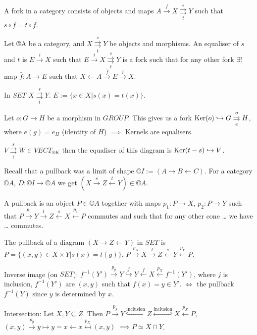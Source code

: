 \documentclass[12pt]{article}					%
\begin{document}
\begin{priklady}[Equalisers]
	A fork in a category consists of objects and maps $A \overset{f}\rightarrow X \overset{s}{\underset{t}\rightrightarrows} Y$ such that $s ∘ f = t ∘ f$.
	\begin{definicein}
		Let ®A be a category, and $X \overset{s}{\underset{t}\rightrightarrows} Y$ be objects and morphisms. An equaliser of $s$ and $t$ is $E \overset{i}\rightarrow X$ such that $E \overset{i}\rightarrow X \overset{s}{\underset{t}\rightrightarrows} Y$ is a fork such that for any other fork $\exists!$ map $\hat{f}: A \rightarrow E$ such that $X \leftarrow A \overset{\hat{f}}\rightarrow E \overset{i}\rightarrow X$.
	\end{definicein}
\end{priklady}

\begin{priklady}
	In $SET$ $X \overset{s}{\underset{t}\rightrightarrows}Y$. $E := \{x \in X | s(x) = t(x)\}$.

	Let $o: G \rightarrow H$ be a morphism in $GROUP$. This gives us a fork $\operatorname{Ker}(o) \hookrightarrow G \overset{o}{\underset{e}\rightrightarrows} H$, where $e(g) = e_H$ (identity of $H$) $\implies$ Kernels are equalisers.

	$V \overset{s}{\underset{t}\rightrightarrows} W \in VECT_{®K}$ then the equaliser of this diagram is $\operatorname{Ker}(t - s) \hookrightarrow V$.
\end{priklady}

\begin{poznamka}[Pullbacks]
	Recall that a pullback was a limit of shape $©I := (A \rightarrow B \leftarrow C)$. For a category $©A$, $D: ©I \rightarrow ©A$ we get $(X \overset{s}\rightarrow Z \overset{t}\leftarrow Y) \in ©A$.

	A pullback is an object $P \in ©A$ together with maps $p_1: P \rightarrow X$, $p_2: P \rightarrow Y$ such that $P \overset{p_1}\rightarrow Y \overset{t}\rightarrow Z \overset{s}\leftarrow X \overset{p_1}\leftarrow P$ commutes and such that for any other cone … we have … commutes.
\end{poznamka}

\begin{priklady}
	The pullback of a diagram $(X \rightarrow Z \leftarrow Y)$ in $SET$ is $P = \{(x, y) \in X \times Y | s(x) = t(y)\}$. $P \overset{p_X}\rightarrow X \overset{t}\rightarrow Z \overset{s}\leftarrow Y \overset{p_Y}\leftarrow P$.

	Inverse image (on $SET$): $f^{-1}(Y') \overset{p_y}\rightarrow Y \overset{j}\hookrightarrow Y \overset{f}\leftarrow X \overset{p_X}\leftarrow f^{-1}(Y')$, where $j$ is inclusion, $f^{-1}(Y')$ are $(x, y)$ such that $f(x) = y \in Y'$. $\Leftrightarrow$ the pullback $f^{-1}(Y)$ since $y$ is determined by $x$.

	Intersection: Let $X, Y \subseteq Z$. Then $P \overset{p_y}\rightarrow Y \overset{\text{inclusion}}\hookrightarrow Z \overset{\text{inclusion}}\hookleftarrow X \overset{p_X}\leftarrow P$, $(x, y) \overset{p_y}\mapsto y \mapsto y = x \mapsfrom x \overset{p_X}\mapsfrom (x, y)$ $\implies P \simeq X \cap Y$.
\end{priklady}
\end{document}
